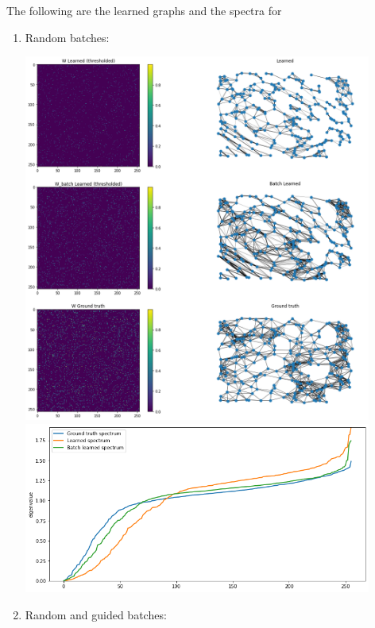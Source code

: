 \documentclass[a4paper]{article}
\begin{document}
The following are the learned graphs and the spectra for
\begin{enumerate}
    \item Random batches:
        \begin{center}
            \includegraphics[width=0.9\textwidth]{images/p3/random_learned_graphs.png}\\
            \includegraphics[width=0.9\textwidth]{images/p3/random_spectrum.png}
        \end{center}
    \item Random and guided batches:
        \begin{center}

\end{center}
\end{enumerate}
\end{document}
